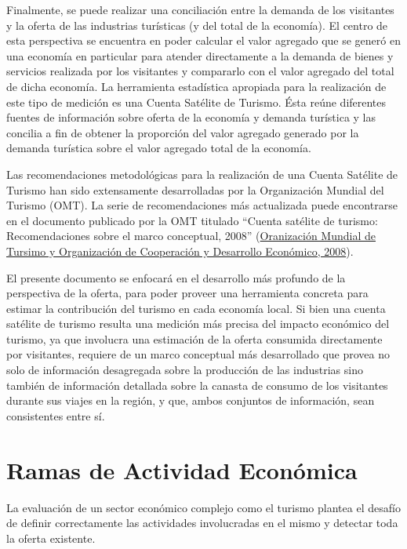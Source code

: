 \documentclass[
  openany]{book}
\begin{document}
Finalmente, se puede realizar una conciliación entre la demanda de los visitantes y la oferta de las industrias turísticas (y del total de la economía). El centro de esta perspectiva se encuentra en poder calcular el valor agregado que se generó en una economía en particular para atender directamente a la demanda de bienes y servicios realizada por los visitantes y compararlo con el valor agregado del total de dicha economía. La herramienta estadística apropiada para la realización de este tipo de medición es una Cuenta Satélite de Turismo. Ésta reúne diferentes fuentes de información sobre oferta de la economía y demanda turística y las concilia a fin de obtener la proporción del valor agregado generado por la demanda turística sobre el valor agregado total de la economía.

Las recomendaciones metodológicas para la realización de una Cuenta Satélite de Turismo han sido extensamente desarrolladas por la Organización Mundial del Turismo (OMT). La serie de recomendaciones más actualizada puede encontrarse en el documento publicado por la OMT titulado ``Cuenta satélite de turismo: Recomendaciones sobre el marco conceptual, 2008'' (\protect\hyperlink{ref-cstrmc2008}{Oranización Mundial de Tursimo y Organización de Cooperación y Desarrollo Económico, 2008}).

El presente documento se enfocará en el desarrollo más profundo de la perspectiva de la oferta, para poder proveer una herramienta concreta para estimar la contribución del turismo en cada economía local. Si bien una cuenta satélite de turismo resulta una medición más precisa del impacto económico del turismo, ya que involucra una estimación de la oferta consumida directamente por visitantes, requiere de un marco conceptual más desarrollado que provea no solo de información desagregada sobre la producción de las industrias sino también de información detallada sobre la canasta de consumo de los visitantes durante sus viajes en la región, y que, ambos conjuntos de información, sean consistentes entre sí.

\hypertarget{ramas-de-actividad-econuxf3mica}{%
\section{Ramas de Actividad Económica}\label{ramas-de-actividad-econuxf3mica}}

La evaluación de un sector económico complejo como el turismo plantea el desafío de definir correctamente las actividades involucradas en el mismo y detectar toda la oferta existente.
\end{document}
